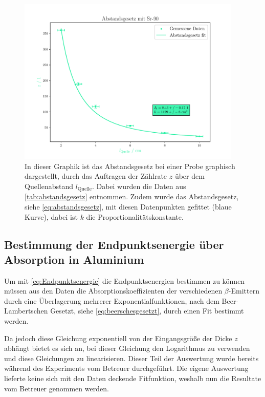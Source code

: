 \documentclass[12pt,english,ngerman]{scrartcl}
\begin{document}
\begin{figure}[H]
	\begin{center}
		\includegraphics[width = 0.95\textwidth]{figures/abstandsgesetz.pdf}
	\end{center}
	\caption[Abstandsgesetz einer  Probe]{In dieser Graphik ist
		das Abstandsgesetz bei einer  Probe graphisch dargestellt,
		durch das Auftragen der Zählrate $z$ über dem Quellenabstand
		$l_{\mathrm{Quelle}}$. Dabei wurden die Daten aus
		\autoref{tab:abstandsgesetz} entnommen. Zudem wurde das Abstandsgesetz, siehe
		\autoref{eq:abstandsgesetz}, mit diesen Datenpunkten gefittet (blaue Kurve),
		dabei ist $k$ die Proportionalitätskonstante.}\label{fig:abstandsgesetz}
\end{figure}

\subsection{Bestimmung der Endpunktsenergie über Absorption in Aluminium}\label{sec:Auswertung_alu}

Um mit \autoref{eq:Endpunktsenergie} die Endpunktsenergien bestimmen zu können
müssen aus den Daten die Absorptionskoeffizienten der verschiedenen
$\beta$-Emittern durch eine Überlagerung mehrerer Exponentialfunktionen, nach
dem Beer-Lambertschen Gesetzt, siehe \autoref{eq:beerschesgesetzt}, durch einen
Fit bestimmt werden.

Da jedoch diese Gleichung exponentiell von der Eingangsgröße der Dicke $z$
abhängt bietet es sich an, bei dieser Gleichung den Logarithmus zu verwenden
und diese Gleichungen zu linearisieren. Dieser Teil der Auswertung wurde
bereits während des Experiments vom Betreuer durchgeführt. Die eigene
Auswertung lieferte keine sich mit den Daten deckende Fitfunktion, weshalb nun
die Resultate vom Betreuer genommen werden.
\end{document}
